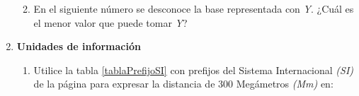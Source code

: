 \documentclass[12pt]{article}
\begin{document}
\begin{enumerate}
\begin{enumerate}

        \item En el siguiente número se desconoce la base representada con
            \emph{Y}. ¿Cuál es el menor valor que puede tomar \emph{Y}?



    \end{enumerate}

    \item \textbf{Unidades de información}

    \begin{enumerate}

        \item Utilice la tabla \ref{tablaPrefijoSI} con prefijos del Sistema Internacional
            \emph{(SI)} de la página \pageref{tablaPrefijoSI} para expresar la
            distancia de 300 Megámetros \emph{(Mm)} en:

\end{enumerate}
\end{enumerate}
\end{document}

